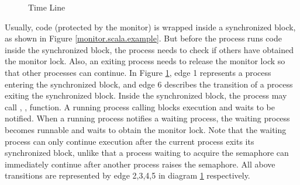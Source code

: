 \documentclass{article}
\begin{document}
\begin{figure}
  \centering
\caption{Time Line}
\label{monitor.states}
\end{figure}
Usually, code (protected by the monitor) is wrapped inside a synchronized block, as shown in Figure \ref{monitor.scala.example}. But before the process runs code inside the synchronized block, the process needs to check if others have obtained the monitor lock. Also, an exiting process needs to release the monitor lock so that other processes can continue. In Figure \ref{monitor.states}, edge 1 represents a process entering the synchronized block, and edge 6 describes the transition of a process exiting the synchronized block. Inside the synchronized block, the process may call , ,  function. A running process calling  blocks execution and waits to be notified. When a running process notifies a waiting process, the waiting process becomes runnable and waits to obtain the monitor lock. Note that the waiting process can only continue execution after the current process exits its synchronized block, unlike that a process waiting to acquire the semaphore can immediately continue after another process raises the semaphore. All above transitions are represented by edge 2,3,4,5 in diagram \ref{monitor.states} respectively. 
\end{document}
